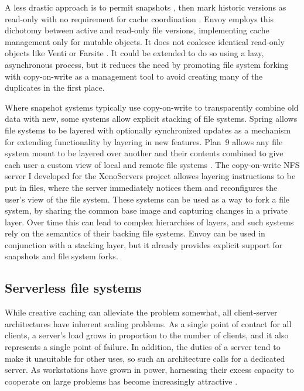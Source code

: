 A less drastic approach is to permit snapshots \cite{hitz}, then mark historic versions as read-only with no requirement for cache coordination \cite{warfield}. Envoy employs this dichotomy between active and read-only file versions, implementing cache management only for mutable objects. It does not coalesce identical read-only objects like Venti or Farsite \cite{douceur02}. It could be extended to do so using a lazy, asynchronous process, but it reduces the need by promoting file system forking with copy-on-write as a management tool to avoid creating many of the duplicates in the first place.

Where snapshot systems typically use copy-on-write to transparently combine old data with new, some systems allow explicit stacking of file systems. Spring \cite{khalidi} allows file systems to be layered with optionally synchronized updates as a mechanism for extending functionality by layering in new features. Plan~9 \cite{pike90} allows any file system mount to be layered over another and their contents combined to give each user a custom view of local and remote file systems \cite{pike92}. The copy-on-write NFS server I developed for the XenoServers project \cite{kotsovinos04b} allowes layering instructions to be put in files, where the server immediately notices them and reconfigures the user's view of the file system. These systems can be used as a way to fork a file system, by sharing the common base image and capturing changes in a private layer. Over time this can lead to complex hierarchies of layers, and such systems rely on the semantics of their backing file systems. Envoy can be used in conjunction with a stacking layer, but it already provides explicit support for snapshots and file system forks.

\subsection{Serverless file systems}

While creative caching can alleviate the problem somewhat, all client-server architectures have inherent scaling problems. As a single point of contact for all clients, a server's load grows in proportion to the number of clients, and it also represents a single point of failure. In addition, the duties of a server tend to make it unsuitable for other uses, so such an architecture calls for a dedicated server. As workstations have grown in power, harnessing their excess capacity to cooperate on large problems has become increasingly attractive \cite{anderson95a}.

